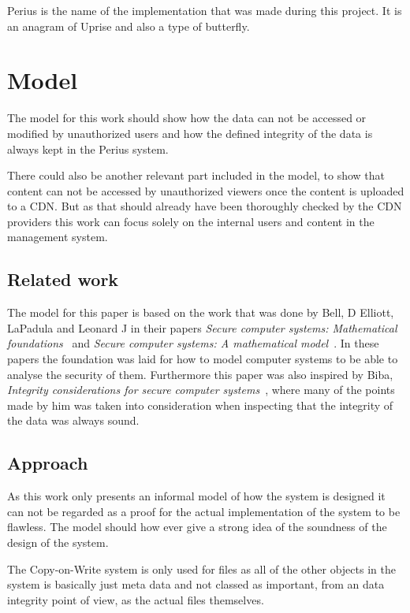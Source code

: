 \documentclass[a4paper,12pt]{article}
\newcounter{subsubsubsection}[subsubsection]
\begin{document}
Perius is the name of the implementation that was made during this project. It is an anagram of
Uprise and also a type of butterfly.

\newpage
\section{Model} \label{sec:model}
The model for this work should show how the data can not be accessed or modified by unauthorized
users and how the defined integrity of the data is always kept in the Perius system. 

There could also be another relevant part included in the model, to show that content can not be 
accessed by unauthorized viewers once the content is uploaded to a CDN. But as that should already 
have been thoroughly checked by the CDN providers this work can focus solely on the internal users 
and content in the management system. 

\subsection{Related work}
The model for this paper is based on the work that was done by Bell, D Elliott, LaPadula and 
Leonard J in their papers \textit{Secure computer systems: Mathematical foundations}~\cite{BLP1} 
and \textit{Secure computer systems: A mathematical model}~\cite{BLP2}. 
In these papers the foundation was laid for how to model computer systems to be able to analyse 
the security of them. Furthermore this paper was also inspired by Biba, \textit{Integrity 
considerations for secure computer systems}~\cite{BIBA}, where many of the points made by him was 
taken into consideration when inspecting that the integrity of the data was always sound.

\subsection{Approach}
As this work only presents an informal model of how the system is designed it can not be regarded as
a proof for the actual implementation of the system to be flawless. The model should how ever give a 
strong idea of the soundness of the design of the system.

The Copy-on-Write system is only used for files as all of the other objects in the system is
basically just meta data and not classed as important, from an data integrity point of view, as the 
actual files themselves. 
\end{document}
